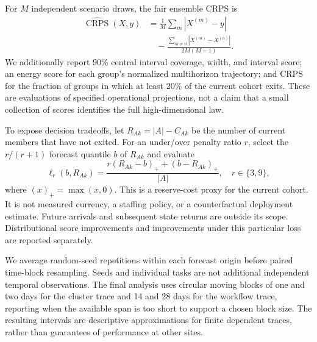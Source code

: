 For $M$ independent scenario draws, the fair ensemble CRPS
\citep{ferro2014,gneiting2007} is
\begin{equation}
 \begin{aligned}
 \widehat{\operatorname{CRPS}}(X,y)&=
 \frac{1}{M}\sum_m |X^{(m)}-y|\\
 &\quad-\frac{\sum_{m\ne n}|X^{(m)}-X^{(n)}|}{2M(M-1)}.
 \end{aligned}
\end{equation}
We additionally report 90\% central interval coverage, width, and interval
score; an energy score for each group's normalized multihorizon trajectory;
and CRPS for the fraction of groups in which at least 20\% of the current cohort
exits. These are evaluations of specified operational projections, not a claim
that a small collection of scores identifies the full high-dimensional law.

To expose decision tradeoffs, let $R_{Ak}=|A|-C_{Ak}$ be the number of current
members that have not exited. For an under/over penalty ratio $r$, select the
$r/(r+1)$ forecast quantile $b$ of $R_{Ak}$ and evaluate
\begin{equation}
 \ell_r(b,R_{Ak})=
 \frac{r(R_{Ak}-b)_++(b-R_{Ak})_+}{|A|},
 \quad r\in\{3,9\},
\end{equation}
where $(x)_+=\max(x,0)$. This is a reserve-cost proxy for the current cohort. It is not measured
currency, a staffing policy, or a counterfactual deployment estimate. Future
arrivals and subsequent state returns are outside its scope. Distributional
score improvements and improvements under this particular loss are reported
separately.

We average random-seed repetitions within each forecast origin before paired
time-block resampling. Seeds and individual tasks are not additional independent
temporal observations. The final analysis uses circular moving blocks of one
and two days for the cluster trace and 14 and 28 days for the workflow trace,
reporting when the available span is too short to support a chosen block size.
The resulting intervals are descriptive approximations for finite dependent
traces, rather than guarantees of performance at other sites.
